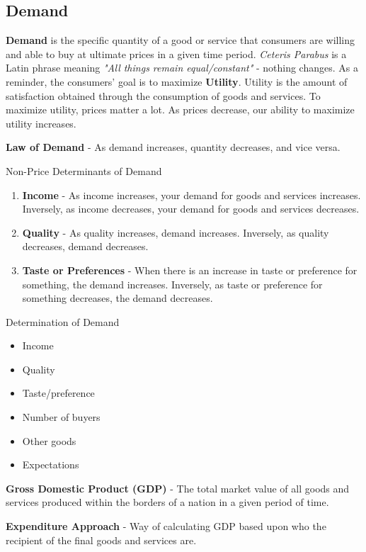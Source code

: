 \documentclass{article}
\begin{document}
\subsection{Demand}

\textbf{Demand} is the specific quantity of a good or service that consumers are willing and able to buy at ultimate prices in a given time period. \textit{Ceteris Parabus} is a Latin phrase meaning \textit{"All things remain equal/constant"} - nothing changes. As a reminder, the consumers' goal is to maximize \textbf{Utility}. Utility is the amount of satisfaction obtained through the consumption of goods and services. To maximize utility, prices matter a lot. As prices decrease, our ability to maximize utility increases.

\textbf{Law of Demand} - As demand increases, quantity decreases, and vice versa.

Non-Price Determinants of Demand

\begin{enumerate}
    \item{\textbf{Income}} - As income increases, your demand for goods and services increases. Inversely, as income decreases, your demand for goods and services decreases.
    \item{\textbf{Quality}} - As quality increases, demand increases. Inversely, as quality decreases, demand decreases.
    \item{\textbf{Taste or Preferences}} - When there is an increase in taste or preference for something, the demand increases. Inversely, as taste or preference for something decreases, the demand decreases.
\end{enumerate}

Determination of Demand
\begin{itemize}
    \item Income
    \item Quality
    \item Taste/preference
    \item Number of buyers
    \item Other goods
    \item Expectations
\end{itemize}

\textbf{Gross Domestic Product (GDP)} - The total market value of all goods and services produced within the borders of a nation in a given period of time.

\textbf{Expenditure Approach} - Way of calculating GDP based upon who the recipient of the final goods and services are.
\end{document}
